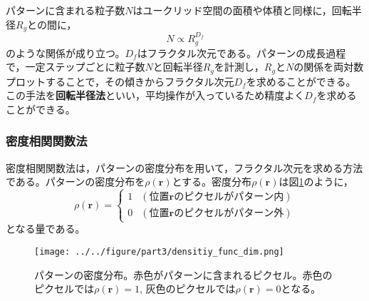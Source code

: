 \documentclass[autodetect-engine,dvi=dvipdfmx,a4paper,ja=standard,oneside,openany,11pt]{bxjsbook}
\begin{document}
パターンに含まれる粒子数$N$はユークリッド空間の面積や体積と同様に，回転半径$R_g$との間に，
\begin{equation}
  N\propto R_g^{D_f}
  \label{eq:gyration_radius_fractal}
\end{equation}
のような関係が成り立つ。$D_f$はフラクタル次元である。パターンの成長過程で，一定ステップごとに粒子数$N$と回転半径$R_g$を計測し，$R_g$と$N$の関係を両対数プロットすることで，その傾きからフラクタル次元$D_f$を求めることができる。この手法を\textbf{回転半径法}といい，平均操作が入っているため精度よく$D_f$を求めることができる。

\subsubsection{密度相関関数法}
\label{sec:density_correlation}
密度相関関数法は，パターンの密度分布を用いて，フラクタル次元を求める方法である。パターンの密度分布を$\rho(\bm{r})$とする。密度分布$\rho(\bm{r})$は図\ref{fig:density_func_dif}のように，
\begin{equation}
  \rho(\bm{r})=
  \begin{cases}
    1 & (\mathrm{位置}\bm{r}\mathrm{のピクセルがパターン内}) \\
    0 & (\mathrm{位置}\bm{r}\mathrm{のピクセルがパターン外})
  \end{cases}
  \label{eq:density_distribution}
\end{equation}
となる量である。
\begin{figure}[htbp]
  \centering
  \texttt{[image: ../../figure/part3/densitiy\_func\_dim.png]}
  \caption{パターンの密度分布。赤色がパターンに含まれるピクセル。赤色のピクセルでは$\rho(\bm{r})=1$, 灰色のピクセルでは$\rho(\bm{r})=0$となる。}
  \label{fig:density_func_dif}
\end{figure}
\end{document}
